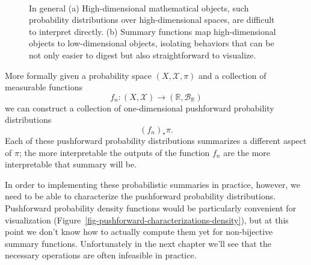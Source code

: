 \documentclass[
  letterpaper,
  DIV=11,
  numbers=noendperiod]{scrartcl}
\begin{document}
\begin{figure}
\begin{minipage}[t]{0.90\linewidth}
{\centering 


}

\subcaption{\label{fig-informative-perspectives}}
\end{minipage}%
%
\begin{minipage}[t]{0.05\linewidth}

{\centering 

~

}

\end{minipage}%

\caption{\label{fig-projective-viewing}In general (a) High-dimensional
mathematical objects, such probability distributions over
high-dimensional spaces, are difficult to interpret directly. (b)
Summary functions map high-dimensional objects to low-dimensional
objects, isolating behaviors that can be not only easier to digest but
also straightforward to visualize.}

\end{figure}

More formally given a probability space \((X, \mathcal{X}, \pi)\) and a
collection of measurable functions \[
f_{n} : (X, \mathcal{X}) \rightarrow
        (\mathbb{R}, \mathcal{B}_{\mathbb{R}})
\] we can construct a collection of one-dimensional pushforward
probability distributions \[
(f_{n})_{*} \pi.
\] Each of these pushforward probability distributions summarizes a
different aspect of \(\pi\); the more interpretable the outputs of the
function \(f_{n}\) are the more interpretable that summary will be.

In order to implementing these probabilistic summaries in practice,
however, we need to be able to characterize the pushforward probability
distributions. Pushforward probability density functions would be
particularly convenient for visualization
(Figure~\ref{fig-pushforward-characterizations-density}), but at this
point we don't know how to actually compute them yet for non-bijective
summary functions. Unfortunately in the next chapter we'll see that the
necessary operations are often infeasible in practice.
\end{document}
